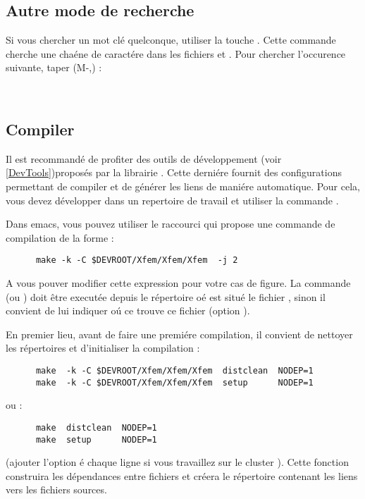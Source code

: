 \subsection{Autre mode de recherche}

Si vous chercher un mot cl\'e quelconque,   utiliser   la touche
. Cette commande cherche une cha\'ene de caract\'ere dans les
fichiers  et . Pour chercher l'occurence
suivante, taper (M-,) :
\begin{description}
 \item[]  ~\touche{,}
 \end{description}





\subsection{Compiler}

Il est recommand\'e de profiter des outils de d\'eveloppement (voir
\ref{DevTools})propos\'es par la librairie . Cette
derni\'ere fournit des configurations permettant de compiler et de
g\'en\'erer les liens de mani\'ere automatique. Pour cela, vous devez
d\'evelopper dans un repertoire de travail     et
utiliser la commande  .

Dans emacs, vous pouvez utiliser le raccourci  qui
propose une commande de compilation de la forme :
\begin{verbatim}
      make -k -C $DEVROOT/Xfem/Xfem/Xfem  -j 2
\end{verbatim}
A vous pouver modifier cette expression pour votre cas de figure. La
commande  (ou ) doit  \^etre execut\'ee depuis le
r\'epertoire o\'e est situ\'e le fichier , sinon il
convient de lui indiquer o\'u ce trouve ce fichier (option ).



En premier lieu, avant de faire une premi\'ere compilation, il
convient de nettoyer les r\'epertoires et d'initialiser la compilation
:
\begin{verbatim}
      make  -k -C $DEVROOT/Xfem/Xfem/Xfem  distclean  NODEP=1
      make  -k -C $DEVROOT/Xfem/Xfem/Xfem  setup      NODEP=1
\end{verbatim}
ou :
\begin{verbatim}
      make  distclean  NODEP=1
      make  setup      NODEP=1
\end{verbatim}
(ajouter l'option  \'e chaque ligne si vous travaillez
sur le cluster ). Cette fonction 
construira les d\'ependances entre fichiers et cr\'eera le r\'epertoire
 contenant les liens vers les fichiers sources.


